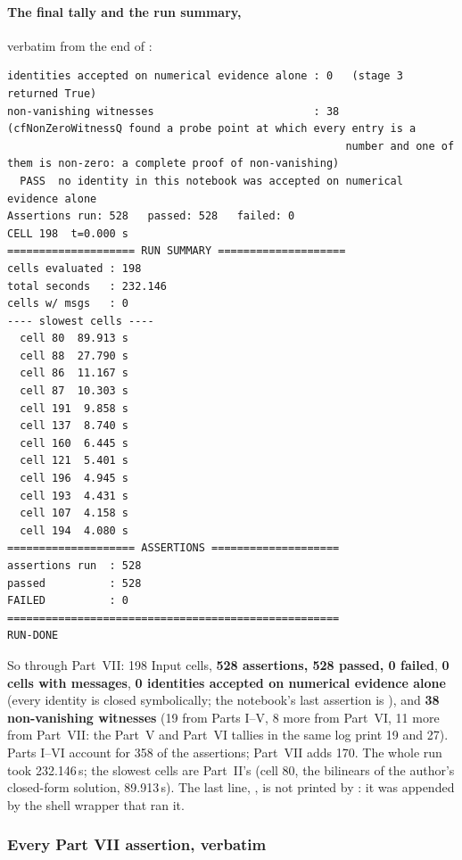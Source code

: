 \paragraph{The final tally and the run summary,} verbatim from the end of
:

\begin{Verbatim}[fontsize=\scriptsize]
identities accepted on numerical evidence alone : 0   (stage 3 returned True)
non-vanishing witnesses                         : 38   (cfNonZeroWitnessQ found a probe point at which every entry is a
                                                     number and one of them is non-zero: a complete proof of non-vanishing)
  PASS  no identity in this notebook was accepted on numerical evidence alone
Assertions run: 528   passed: 528   failed: 0
CELL 198  t=0.000 s
==================== RUN SUMMARY ====================
cells evaluated : 198
total seconds   : 232.146
cells w/ msgs   : 0
---- slowest cells ----
  cell 80  89.913 s
  cell 88  27.790 s
  cell 86  11.167 s
  cell 87  10.303 s
  cell 191  9.858 s
  cell 137  8.740 s
  cell 160  6.445 s
  cell 121  5.401 s
  cell 196  4.945 s
  cell 193  4.431 s
  cell 107  4.158 s
  cell 194  4.080 s
==================== ASSERTIONS ====================
assertions run  : 528
passed          : 528
FAILED          : 0
====================================================
RUN-DONE

\end{Verbatim}

So through Part~VII: 198 Input cells, \textbf{528 assertions, 528 passed, 0 failed}, \textbf{0 cells
with messages}, \textbf{0 identities accepted on numerical evidence alone} (every identity is closed
symbolically; the notebook's last assertion is ), and \textbf{38
non-vanishing witnesses} (19 from Parts I--V, 8 more from Part~VI, 11 more from Part~VII: the Part~V
and Part~VI tallies in the same log print 19 and 27). Parts I--VI account for 358 of the assertions;
Part~VII adds 170. The whole run took 232.146\,s; the slowest cells are Part~II's (cell 80, the
bilinears of the author's closed-form solution, 89.913\,s). The last line, , is not
printed by : it was appended by the shell wrapper that ran it.

\subsubsection{Every Part VII assertion, verbatim}
\label{sec:3.9.2}

